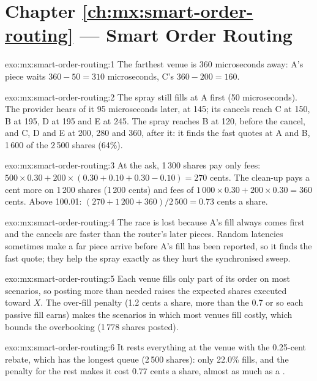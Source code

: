 \section*{Chapter \ref{ch:mx:smart-order-routing} --- Smart Order Routing}

\begin{solution}{exo:mx:smart-order-routing:1}
The farthest venue is 360 microseconds away: A's piece waits $360-50=310$ microseconds, C's $360-200=160$.
\end{solution}

\begin{solution}{exo:mx:smart-order-routing:2}
The spray still fills at A first (50 microseconds). The provider hears of it 95 microseconds later, at 145; its cancels reach C at 150, B at 195, D at
195 and E at 245. The spray reaches B at 120, before the cancel, and C, D and E at 200, 280 and 360, after it: it finds the fast quotes at A and B,
1\,600 of the 2\,500 shares (64\%).
\end{solution}

\begin{solution}{exo:mx:smart-order-routing:3}
At the ask, 1\,300 shares pay only fees: $500\times0.30+200\times(0.30+0.10+0.30-0.10)=270$ cents. The clean-up pays a cent more on 1\,200 shares
(1\,200 cents) and fees of $1\,000\times0.30+200\times0.30=360$ cents. Above 100.01: $(270+1\,200+360)/2\,500=0.73$
cents a share.
\end{solution}

\begin{solution}{exo:mx:smart-order-routing:4}
The race is lost because A's fill always comes first and the cancels are faster than the router's later pieces. Random latencies sometimes make a far
piece arrive before A's fill has been reported, so it finds the fast quote; they help the spray exactly as they hurt the synchronised sweep.
\end{solution}

\begin{solution}{exo:mx:smart-order-routing:5}
Each venue fills only part of its order on most scenarios, so posting more than needed raises the expected shares executed toward $X$. The over-fill
penalty (1.2 cents a share, more than the 0.7 or so each passive fill earns) makes the scenarios in which most venues fill costly, which bounds the
overbooking (1\,778 shares posted).
\end{solution}

\begin{solution}{exo:mx:smart-order-routing:6}
It rests everything at the venue with the 0.25-cent rebate, which has the longest queue (2\,500 shares): only 22.0\% fills, and the penalty for the rest
makes it cost 0.77 cents a share, almost as much as a .
\end{solution}

